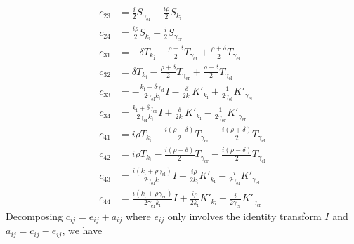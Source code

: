 \begin{align*}
  c_{23} &= \frac{i}{2} S_{\gamma_\text{el}} - \frac{i\rho}{2} S_{k_\text{i}} \\
  c_{24} &= \frac{i\rho}{2} S_{k_\text{i}} - \frac{i}{2} S_{\gamma_\text{er}} \\
  c_{31} &= -\delta T_{k_\text{i}}-\frac{\rho-\delta}{2} T_{\gamma_\text{er}} + \frac{\rho+\delta}{2} T_{\gamma_\text{el}} \\
  c_{32} &= \delta T_{k_\text{i}} - \frac{\rho+\delta}{2} T_{\gamma_\text{er}}+ \frac{\rho-\delta}{2} T_{\gamma_\text{el}} \\
  c_{33} &= -\frac{k_\text{i}+\delta \gamma_\text{el}}{2 \gamma_\text{el} k_\text{i}} I - \frac{\delta}{2 k_\text{i}} K'_{k_\text{i}} + \frac{1}{2 \gamma_\text{el}} K'_{\gamma_\text{el}} \\
  c_{34} &= \frac{k_\text{i}+\delta \gamma_\text{er}}{2 \gamma_\text{er} k_\text{i}} I + \frac{\delta}{2 k_\text{i}} K'_{k_\text{i}} - \frac{1}{2 \gamma_\text{er}} K'_{\gamma_\text{er}} \\
  c_{41} &= i \rho T_{k_\text{i}}-\frac{i(\rho-\delta)}{2} T_{\gamma_\text{er}} - \frac{i(\rho+\delta)}{2} T_{\gamma_\text{el}} \\
  c_{42} &= i \rho T_{k_\text{i}}-\frac{i(\rho+\delta)}{2} T_{\gamma_\text{er}} - \frac{i(\rho-\delta)}{2} T_{\gamma_\text{el}} \\
  c_{43} &= \frac{i(k_\text{i} + \rho\gamma_\text{el})}{2 \gamma_\text{el} k_\text{i}} I + \frac{i\rho}{2 k_\text{i}} K'_{k_\text{i}} - \frac{i}{2 \gamma_\text{el}} K'_{\gamma_\text{el}} \\
  c_{44} &= \frac{i(k_\text{i} + \rho\gamma_\text{er})}{2 \gamma_\text{er} k_\text{i}} I + \frac{i\rho}{2 k_\text{i}} K'_{k_\text{i}} - \frac{i}{2 \gamma_\text{er}} K'_{\gamma_\text{er}}
\end{align*}
Decomposing $c_{ij} = e_{ij} + a_{ij}$ where $e_{ij}$ only involves the identity transform $I$ and $a_{ij}=c_{ij}-e_{ij}$, we have
